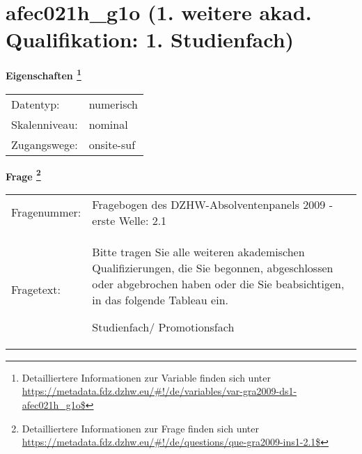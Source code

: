 
    \setcounter{footnote}{0}

    \vspace*{-1.8cm}
	\section{afec021h\_g1o (1. weitere akad. Qualifikation: 1. Studienfach)}
	\label{section:afec021h_g1o}



    \vspace*{0.5cm}
    \noindent\textbf{Eigenschaften
	\footnote{Detailliertere Informationen zur Variable finden sich unter
		\url{https://metadata.fdz.dzhw.eu/\#!/de/variables/var-gra2009-ds1-afec021h_g1o$}}}\\
	\begin{tabularx}{\hsize}{@{}lX}
	Datentyp: & numerisch \\
	Skalenniveau: & nominal \\
	Zugangswege: &
	  onsite-suf
 \\
    \end{tabularx}



				\vspace*{0.5cm}
                \noindent\textbf{Frage
	                \footnote{Detailliertere Informationen zur Frage finden sich unter
		              \url{https://metadata.fdz.dzhw.eu/\#!/de/questions/que-gra2009-ins1-2.1$}}}\\
				\begin{tabularx}{\hsize}{@{}lX}
					Fragenummer: &
					  Fragebogen des DZHW-Absolventenpanels 2009 - erste Welle:
					  2.1
 \\
					Fragetext: & Bitte tragen Sie alle weiteren akademischen Qualifizierungen, die Sie begonnen, abgeschlossen oder abgebrochen haben oder die Sie beabsichtigen, in das folgende Tableau ein.\par  Studienfach/ Promotionsfach \\
				\end{tabularx}





